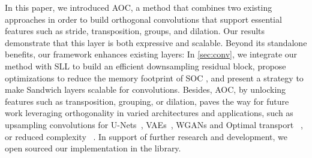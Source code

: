 %
In this paper, we introduced AOC, a method that combines two existing approaches in order to build orthogonal convolutions that support essential features such as stride, transposition, groups, and dilation. Our results demonstrate that this layer is both expressive and scalable.
%
Beyond its standalone benefits, our framework enhances existing layers: In \cref{sec:conv}, we integrate our method with SLL \cite{araujo_unified_2023} to build an efficient downsampling residual block, propose optimizations to reduce the memory footprint of SOC \cite{singla_fantastic_2021}, and present a strategy to make Sandwich layers \cite{wang_direct_2023} scalable for convolutions.
%
Besides, AOC, by unlocking features such as transposition, grouping, or dilation, paves the way for future work leveraging orthogonality in varied architectures and applications, such as upsampling convolutions for U-Nets~\cite{ronneberger2015u}, VAEs~\cite{kingma2013auto},  WGANs and Optimal transport ~\cite{arjovsky2017wasserstein,bethune2024deep}, or reduced complexity ~\cite{li2018csrnet,xie2017aggregated}. 
In support of further research and development, we open sourced our implementation in the \fulllibname{} library.


%
